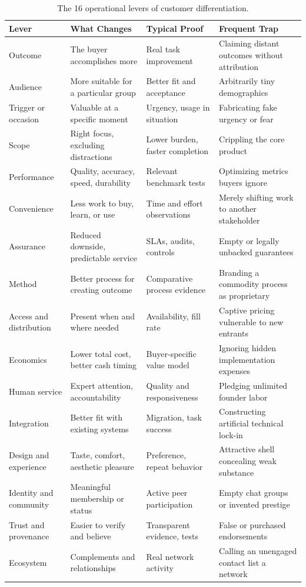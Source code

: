 \begin{table}[t]
\centering
\small
\begin{tabularx}{\textwidth}{>{\raggedright\arraybackslash}p{3.4cm} >{\raggedright\arraybackslash}p{4.0cm} >{\raggedright\arraybackslash}p{3.6cm} >{\raggedright\arraybackslash}X}
\toprule
\textbf{Lever} & \textbf{What Changes} & \textbf{Typical Proof} & \textbf{Frequent Trap} \\
\midrule
Outcome & The buyer accomplishes more & Real task improvement & Claiming distant outcomes without attribution \\
Audience & More suitable for a particular group & Better fit and acceptance & Arbitrarily tiny demographics \\
Trigger or occasion & Valuable at a specific moment & Urgency, usage in situation & Fabricating fake urgency or fear \\
Scope & Right focus, excluding distractions & Lower burden, faster completion & Crippling the core product \\
Performance & Quality, accuracy, speed, durability & Relevant benchmark tests & Optimizing metrics buyers ignore \\
Convenience & Less work to buy, learn, or use & Time and effort observations & Merely shifting work to another stakeholder \\
Assurance & Reduced downside, predictable service & SLAs, audits, controls & Empty or legally unbacked guarantees \\
Method & Better process for creating outcome & Comparative process evidence & Branding a commodity process as proprietary \\
Access and distribution & Present when and where needed & Availability, fill rate & Captive pricing vulnerable to new entrants \\
Economics & Lower total cost, better cash timing & Buyer-specific value model & Ignoring hidden implementation expenses \\
Human service & Expert attention, accountability & Quality and responsiveness & Pledging unlimited founder labor \\
Integration & Better fit with existing systems & Migration, task success & Constructing artificial technical lock-in \\
Design and experience & Taste, comfort, aesthetic pleasure & Preference, repeat behavior & Attractive shell concealing weak substance \\
Identity and community & Meaningful membership or status & Active peer participation & Empty chat groups or invented prestige \\
Trust and provenance & Easier to verify and believe & Transparent evidence, tests & False or purchased endorsements \\
Ecosystem & Complements and relationships & Real network activity & Calling an unengaged contact list a network \\
\bottomrule
\end{tabularx}
\caption{The 16 operational levers of customer differentiation.}
\label{tab:ch8-differentiation-map}
\end{table}


